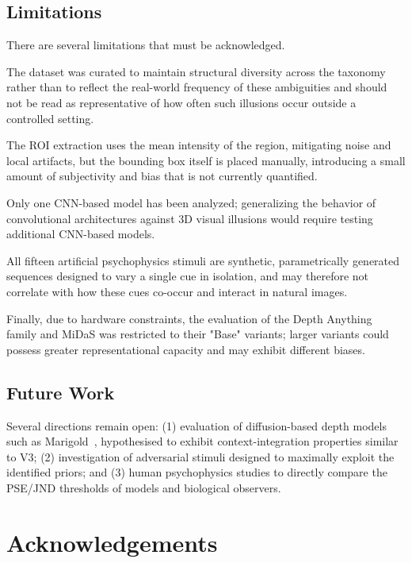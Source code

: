 \documentclass[10pt,twocolumn]{article}
\begin{document}
\subsection*{Limitations}

There are several limitations that must be acknowledged.

The dataset was curated to maintain structural diversity across the taxonomy
rather than to reflect the real-world frequency of these ambiguities and
should not be read as representative of how often such illusions occur outside
a controlled setting.

The ROI extraction uses the mean intensity of the region, mitigating noise and
local artifacts, but the bounding box itself is placed manually, introducing a
small amount of subjectivity and bias that is not currently quantified.

Only one CNN-based model has been analyzed; generalizing the behavior of
convolutional architectures against 3D visual illusions would require testing
additional CNN-based models.

All fifteen artificial psychophysics stimuli are synthetic, parametrically
generated sequences designed to vary a single cue in isolation, and may
therefore not correlate with how these cues co-occur and interact in natural
images.

Finally, due to hardware constraints, the evaluation of the Depth Anything
family and MiDaS was restricted to their "Base" variants; larger variants
could possess greater representational capacity and may exhibit different
biases.

\subsection*{Future Work}

Several directions remain open: (1) evaluation of diffusion-based depth models such as
Marigold~\cite{marigold2024}, hypothesised to exhibit context-integration properties similar to V3; (2) investigation of adversarial stimuli designed to maximally exploit the
identified priors; and (3) human psychophysics studies to directly compare the PSE/JND
thresholds of models and biological observers.

\section*{Acknowledgements}
\end{document}
